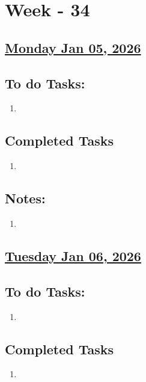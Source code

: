 \section{Week - 34}

\subsection*{\underline{Monday Jan 05, 2026}}
\subsection*{To do Tasks:}
\begin{enumerate}
    \item 
\end{enumerate}
\subsection*{Completed Tasks}
\begin{enumerate}[\ding{52}]  %
    \item 
\end{enumerate}
\subsection*{Notes:}
\begin{enumerate}
    \item 
\end{enumerate}
\subsection*{\underline{Tuesday Jan 06, 2026}}
\subsection*{To do Tasks:}
\begin{enumerate}
    \item  
\end{enumerate}
\subsection*{Completed Tasks}
\begin{enumerate}[\ding{52}]  %
    \item 
\end{enumerate}
